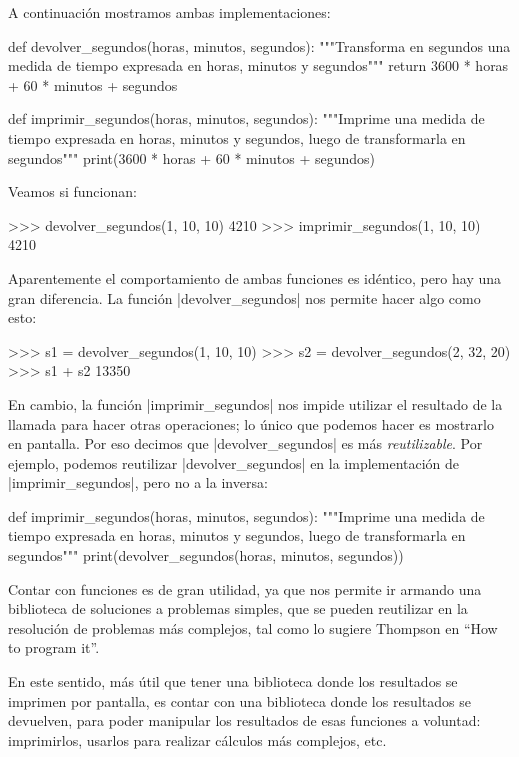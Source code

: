 A continuación mostramos ambas implementaciones:

\begin{codigo-python-sn}
def devolver_segundos(horas, minutos, segundos):
    """Transforma en segundos una medida de tiempo expresada en
       horas, minutos y segundos"""
    return 3600 * horas + 60 * minutos + segundos

def imprimir_segundos(horas, minutos, segundos):
    """Imprime una medida de tiempo expresada en horas, minutos y
       segundos, luego de transformarla en segundos"""
    print(3600 * horas + 60 * minutos + segundos)
\end{codigo-python-sn}

Veamos si funcionan:

\begin{codigo-python-sn}
>>> devolver_segundos(1, 10, 10)
4210
>>> imprimir_segundos(1, 10, 10)
4210
\end{codigo-python-sn}

Aparentemente el comportamiento de ambas funciones es idéntico, pero hay una
gran diferencia. La función |devolver_segundos| nos permite hacer algo como
esto:

\begin{codigo-python-sn}
>>> s1 = devolver_segundos(1, 10, 10)
>>> s2 = devolver_segundos(2, 32, 20)
>>> s1 + s2
13350
\end{codigo-python-sn}

En cambio, la función |imprimir_segundos| nos impide utilizar el resultado de
la llamada para hacer otras operaciones; lo único que podemos hacer es
mostrarlo en pantalla. Por eso decimos que |devolver_segundos| es más
\emph{reutilizable}. Por ejemplo, podemos reutilizar |devolver_segundos| en la
implementación de |imprimir_segundos|, pero no a la inversa:

\begin{codigo-python-sn}
def imprimir_segundos(horas, minutos, segundos):
    """Imprime una medida de tiempo expresada en horas, minutos y
       segundos, luego de transformarla en segundos"""
    print(devolver_segundos(horas, minutos, segundos))
\end{codigo-python-sn}

Contar con funciones es de gran utilidad, ya que nos permite ir armando una
biblioteca de soluciones a problemas simples, que se pueden reutilizar en la
resolución de problemas más complejos, tal como lo sugiere Thompson en ``How to
program it''.

En este sentido, más útil que tener una biblioteca donde los resultados
se imprimen por pantalla, es contar con una biblioteca donde los
resultados se devuelven, para poder manipular los resultados de esas funciones
a voluntad: imprimirlos, usarlos para realizar cálculos más complejos, etc.

